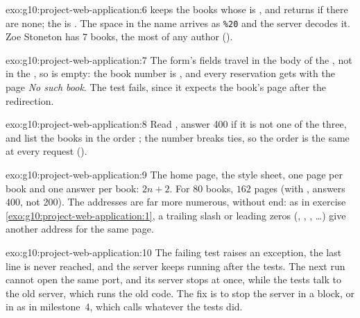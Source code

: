 \begin{solution}{exo:g10:project-web-application:6}
 keeps the books whose  is , and returns
 if there are none; the  is . The space in the name
arrives as \texttt{\%20} and the server decodes it. Zoe Stoneton has $7$ books, the most of any author
().
\end{solution}

\begin{solution}{exo:g10:project-web-application:7}
The form's fields travel in the body of the , not in the , so  is empty: the
book number is , and every reservation gets  with the page \textit{No such book}. The test
 fails, since it expects the book's page after the redirection.
\end{solution}

\begin{solution}{exo:g10:project-web-application:8}
Read , answer 400 if it is not one of the three, and list the books
in the order ; the number  breaks ties, so the order
is the same at every request ().
\end{solution}

\begin{solution}{exo:g10:project-web-application:9}
The home page, the style sheet, one page per book and one  answer per book: $2n + 2$. For $80$ books, $162$
pages (with ,  answers 400, not 200). The addresses are far more numerous, without end: as in
exercise \ref{exo:g10:project-web-application:1}, a trailing slash or leading zeros (, ,
, \dots) give another address for the same page.
\end{solution}

\begin{solution}{exo:g10:project-web-application:10}
The failing test raises an exception, the last line is never reached, and the server keeps running after the tests.
The next run cannot open the same port, and its server stops at once, while the tests talk to the old server, which
runs the old code. The fix is to stop the server in a  block, or in  as in
milestone~4, which  calls whatever the tests did.
\end{solution}

